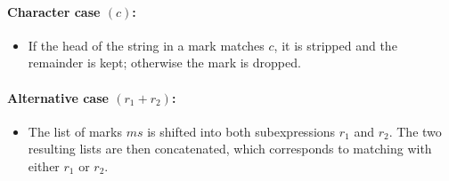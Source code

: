 \documentclass[12pt]{article}
\begin{document}
\paragraph*{\textbf{Character case} $(c)$:}
\begin{itemize}
  \item If the head of the string in a mark matches $c$, it is stripped and the remainder is kept; otherwise the mark is dropped.
\end{itemize}

\paragraph*{\textbf{Alternative case} $(r_1 + r_2)$:}
\begin{itemize}
  \item The list of marks $ms$ is shifted into both subexpressions $r_1$ and $r_2$.  
        The two resulting lists are then concatenated, 
        which corresponds to matching with either $r_1$ or $r_2$.
\end{itemize}
\end{document}
